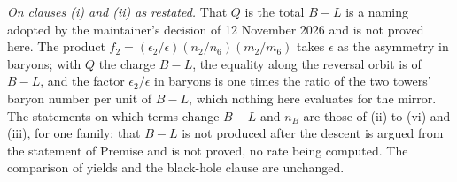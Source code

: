 \emph{On clauses (i) and (ii) as restated.} That $Q$ is the total $B - L$ is a naming adopted by the maintainer's decision of 12 November 2026 and is not proved here. The product $f_{2} = (\epsilon_{2}/\epsilon)(n_{2}/n_{6})(m_{2}/m_{6})$ takes $\epsilon$ as the asymmetry in baryons; with $Q$ the charge $B - L$, the equality along the reversal orbit is of $B - L$, and the factor $\epsilon_{2}/\epsilon$ in baryons is one times the ratio of the two towers' baryon number per unit of $B - L$, which nothing here evaluates for the mirror. The statements on which terms change $B - L$ and $n_{B}$ are those of (ii) to (vi) and (iii), for one family; that $B - L$ is not produced after the descent is argued from the statement of Premise  and is not proved, no rate being computed. The comparison of yields and the black-hole clause are unchanged.
